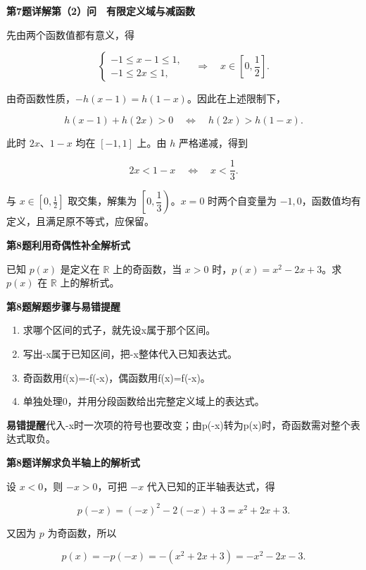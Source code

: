 \documentclass[UTF8,10pt,aspectratio=169]{ctexbeamer}
\newcommand{\PageHeading}[1]{\begin{center}{\Large\bfseries #1}\end{center}\vspace{0.12cm}}
\begin{document}
\begin{frame}[t]
\PageHeading{第7题详解\quad 第（2）问　有限定义域与减函数}
先由两个函数值都有意义，得
\par
\pause
\[\begin{cases}-1\le x-1\le1,\\-1\le2x\le1,\end{cases}\quad\Longrightarrow\quad x\in\left[0,\frac12\right].\]
\par
由奇函数性质，$-h(x-1)=h(1-x)$。因此在上述限制下，
\par
\[h(x-1)+h(2x)>0\quad\Longleftrightarrow\quad h(2x)>h(1-x).\]
\par
此时 $2x$、$1-x$ 均在 $[-1,1]$ 上。由 $h$ 严格递减，得到
\par
\[2x<1-x\quad\Longleftrightarrow\quad x<\frac13.\]
\par
与 $x\in[0,\tfrac12]$ 取交集，解集为 $\boxed{\left[0,\dfrac13\right)}$。$x=0$ 时两个自变量为 $-1,0$，函数值均有定义，且满足原不等式，应保留。
\par
\end{frame}
\begin{frame}[t]
\PageHeading{第8题\quad 利用奇偶性补全解析式}
已知 $p(x)$ 是定义在 $\mathbb R$ 上的奇函数，当 $x>0$ 时，$p(x)=x^2-2x+3$。求 $p(x)$ 在 $\mathbb R$ 上的解析式。
\par
\end{frame}
\begin{frame}[t]
\PageHeading{第8题\quad 解题步骤与易错提醒}
\begin{enumerate}\item 求哪个区间的式子，就先设x属于那个区间。
\item 写出-x属于已知区间，把-x整体代入已知表达式。
\item 奇函数用f(x)=-f(-x)，偶函数用f(x)=f(-x)。
\item 单独处理0，并用分段函数给出完整定义域上的表达式。\end{enumerate}
\par
\pause
\vspace{0.18cm}\textbf{易错提醒}\quad 代入-x时一次项的符号也要改变；由p(-x)转为p(x)时，奇函数需对整个表达式取负。
\par
\end{frame}
\begin{frame}[t]
\PageHeading{第8题详解\quad 求负半轴上的解析式}
设 $x<0$，则 $-x>0$，可把 $-x$ 代入已知的正半轴表达式，得
\par
\pause
\[p(-x)=(-x)^2-2(-x)+3=x^2+2x+3.\]
\par
又因为 $p$ 为奇函数，所以
\par
\[p(x)=-p(-x)=-(x^2+2x+3)=-x^2-2x-3.\]
\par
\end{frame}
\end{document}
